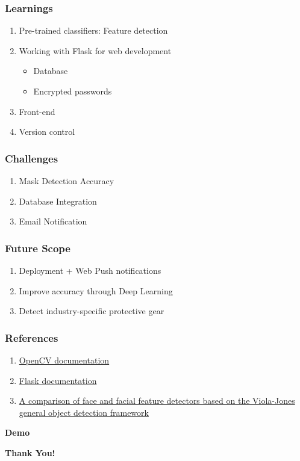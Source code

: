 \documentclass[14pt]{beamer}
\begin{document}
\begin{frame}
    \frametitle{Learnings}
    \begin{enumerate}
        \item Pre-trained classifiers: Feature detection
        \item Working with Flask for web development
        \begin{itemize}
            \item Database
            \item Encrypted passwords
        \end{itemize}
        \item Front-end
        \item Version control
    \end{enumerate}
\end{frame}

\begin{frame}
    \frametitle{Challenges}
    \begin{enumerate}
        \item Mask Detection Accuracy
        \item Database Integration
        \item Email Notification 
    \end{enumerate}
\end{frame}


\begin{frame}
    \frametitle{Future Scope}
    \begin{enumerate}
        \item Deployment + Web Push notifications
        \item Improve accuracy through Deep Learning
        \item Detect industry-specific protective gear
    \end{enumerate}
\end{frame}

\begin{frame}
    \frametitle{References}
    \begin{enumerate}
        \item \href{https://opencv.org/}{OpenCV documentation} 
        \item \href{https://flask.palletsprojects.com/en/1.1.x/}{Flask documentation} 
        \item \href{https://link.springer.com/article/10.1007/s00138-010-0250-7}{A comparison of face and facial feature detectors based on the Viola-Jones general object detection framework}
    \end{enumerate}
\end{frame}

\begin{frame}[c]{ }
    \centering
\huge \textbf{Demo}
\end{frame}
\begin{frame}[c]{ }
    \centering
\huge \textbf{Thank You!}
\end{frame}
\end{document}
